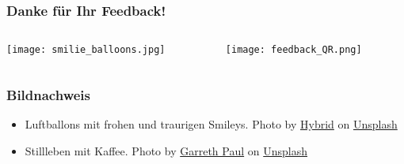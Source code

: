 \documentclass{beamer}
\begin{document}
\begin{frame}
\frametitle{Danke für Ihr Feedback!}

\begin{columns}[c]

\begin{column}{6cm}
\begin{center}
 \texttt{[image: smilie\_balloons.jpg]}
\end{center}

\end{column}

\begin{column}{4cm}


\begin{center}
\texttt{[image: feedback\_QR.png]}
\end{center}
\end{column}


\end{columns}
\end{frame}




\begin{frame}
\frametitle{Bildnachweis}
\begin{tiny}



 
\begin{itemize}

\item
Luftballons mit frohen und traurigen Smileys. Photo by \href{https://unsplash.com/@artbyhybrid?utm_source=unsplash&utm_medium=referral&utm_content=creditCopyText}{Hybrid} on \href{https://unsplash.com/s/photos/feedback?utm_source=unsplash&utm_medium=referral&utm_content=creditCopyText}{Unsplash}


\item
Stillleben mit Kaffee. Photo by \href{https://unsplash.com/@garrethpb?utm_source=unsplash&utm_medium=referral&utm_content=creditCopyText}{Garreth Paul} on \href{https://unsplash.com/s/photos/still-life?utm_source=unsplash&utm_medium=referral&utm_content=creditCopyText}{Unsplash}
  
\end{itemize}
\end{tiny}
\end{frame}
\end{document}
